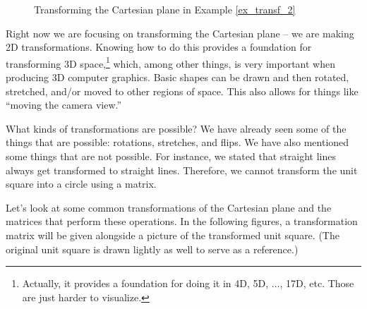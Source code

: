 {\begin{figure}[h!]
\begin{center}
\end{center}
\caption{Transforming the Cartesian plane in Example \ref{ex_transf_2}}
\label{fig:transf_2_2}
\end{figure}
}

Right now we are focusing on transforming the Cartesian plane -- we are making 2D transformations. Knowing how to do this provides a foundation for transforming 3D space,\footnote{Actually, it provides a foundation for doing it in 4D, 5D, $\ldots$, 17D, etc. Those are just harder to visualize.} which, among other things, is very important when producing 3D computer graphics. %
 Basic shapes can be drawn and then rotated, stretched, and/or moved to other regions of space. This also allows for things like ``moving the camera view.'' 

What kinds of transformations are possible? We have already seen some of the things that are possible: rotations, stretches, and flips. We have also mentioned some things that are not possible. For instance, we stated that straight lines always get transformed to straight lines. Therefore, we cannot transform the unit square into a circle using a matrix.

Let's look at some common transformations of the Cartesian plane and the matrices that perform these operations. In the following figures, a transformation matrix will be given alongside a picture of the transformed unit square. (The original unit square is drawn lightly as well to serve as a reference.)\\

